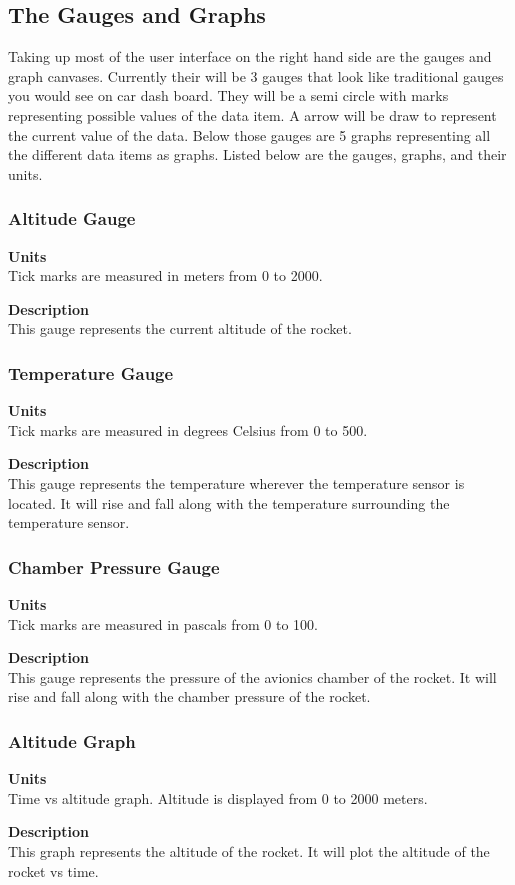 \documentclass[10pt,draftclsnofoot,onecolumn,compsoc]{IEEEtran}
\begin{document}
\subsection{The Gauges and Graphs}
Taking up most of the user interface on the right hand side are the gauges and graph canvases. Currently their will be 3 gauges that look like traditional gauges you would see on car dash board. They will be a semi circle with marks representing possible values of the data item. A arrow will be draw to represent the current value of the data. Below those gauges are 5 graphs representing all the different data items as graphs. Listed below are the gauges, graphs, and their units.

\subsubsection{Altitude Gauge}
{\bf Units} \\ Tick marks are measured in meters from 0 to 2000.\par
{\bf Description} \\ This gauge represents the current altitude of the rocket.\par

\subsubsection{Temperature Gauge}
{\bf Units} \\ Tick marks are measured in degrees Celsius from 0 to 500.\par
{\bf Description} \\ This gauge represents the temperature wherever the temperature sensor is located. It will rise and fall along with the temperature surrounding the temperature sensor.\par

\subsubsection{Chamber Pressure Gauge}
{\bf Units} \\ Tick marks are measured in pascals from 0 to 100.\par
{\bf Description} \\ This gauge represents the pressure of the avionics chamber of the rocket. It will rise and fall along with the chamber pressure of the rocket. \par

\subsubsection{Altitude Graph}
{\bf Units} \\ Time vs altitude graph. Altitude is displayed from 0 to 2000 meters.\par
{\bf Description} \\ This graph represents the altitude of the rocket. It will plot the altitude of the rocket vs time. \par
\end{document}
